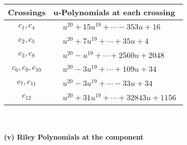 \documentclass[1p]{elsarticle_modified}
\theoremstyle{definition}
\begin{document}
\begin{tabular}{m{50pt}|m{274pt}}
Crossings & \hspace{64pt}u-Polynomials at each crossing \\
\hline $$\begin{aligned}c_{1},c_{4}\end{aligned}$$&$\begin{aligned}
&u^{20}+15 u^{19}+\cdots-353 u+16
\end{aligned}$\\
\hline $$\begin{aligned}c_{2},c_{5}\end{aligned}$$&$\begin{aligned}
&u^{20}+7 u^{19}+\cdots+35 u+4
\end{aligned}$\\
\hline $$\begin{aligned}c_{3},c_{8}\end{aligned}$$&$\begin{aligned}
&u^{20}- u^{19}+\cdots+2560 u+2048
\end{aligned}$\\
\hline $$\begin{aligned}c_{6},c_{9},c_{10}\end{aligned}$$&$\begin{aligned}
&u^{20}-3 u^{19}+\cdots+109 u+34
\end{aligned}$\\
\hline $$\begin{aligned}c_{7},c_{11}\end{aligned}$$&$\begin{aligned}
&u^{20}-3 u^{19}+\cdots-33 u+34
\end{aligned}$\\
\hline $$\begin{aligned}c_{12}\end{aligned}$$&$\begin{aligned}
&u^{20}+31 u^{19}+\cdots+32843 u+1156
\end{aligned}$\\
\hline
\end{tabular}\\~\\
\newpage\renewcommand{\arraystretch}{1}
\flushleft \textbf{(v) Riley Polynomials at the component}\newline \\
\end{document}
